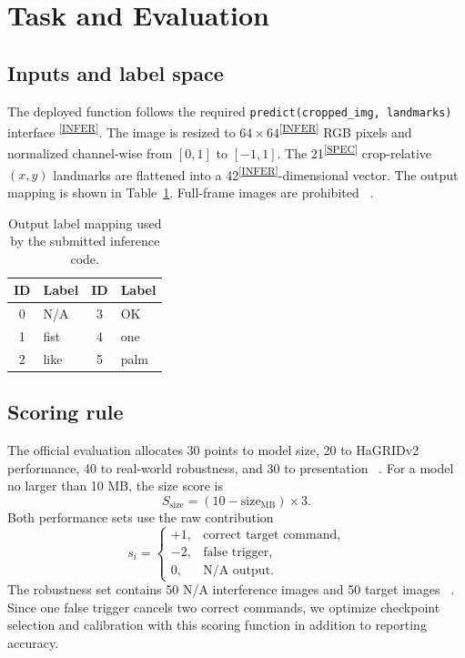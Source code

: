 \documentclass[10pt,twocolumn,a4paper]{article}
\newcommand{\evidence}[1]{\textsuperscript{\scriptsize[\hyperref[ev:#1]{#1}]}}
\newcommand{\result}[2]{#1\evidence{#2}}
\begin{document}
\section{Task and Evaluation}
\label{sec:task}

\subsection{Inputs and label space}

The deployed function follows the required
\texttt{predict(cropped\_img, landmarks)} interface
\evidence{INFER}. The image is resized to
\result{$64\times64$}{INFER} RGB pixels and normalized channel-wise from
$[0,1]$ to $[-1,1]$. The \result{21}{SPEC} crop-relative $(x,y)$ landmarks are
flattened into a \result{42}{INFER}-dimensional vector. The output mapping is
shown in Table~\ref{tab:classes}. Full-frame images are prohibited
~\cite{courseSpec}.

\begin{table}[!b]
  \centering
  \caption{Output label mapping used by the submitted inference code.}
  \label{tab:classes}
  \small
  \begin{tabular}{cl@{\qquad}cl}
    \toprule
    ID & Label & ID & Label \\
    \midrule
    0 & N/A & 3 & OK \\
    1 & fist & 4 & one \\
    2 & like & 5 & palm \\
    \bottomrule
  \end{tabular}
\end{table}

\subsection{Scoring rule}

The official evaluation allocates 30 points to model size, 20 to HaGRIDv2
performance, 40 to real-world robustness, and 30 to presentation
~\cite{courseSpec}. For a model no larger than 10 MB, the size score is
\begin{equation}
S_{\mathrm{size}}=(10-\mathrm{size}_{\mathrm{MB}})\times3.
\end{equation}
Both performance sets use the raw contribution
\begin{equation}
s_i =
\begin{cases}
  +1, & \text{correct target command},\\
  -2, & \text{false trigger},\\
  0,  & \text{N/A output}.
\end{cases}
\end{equation}
The robustness set contains 50 N/A interference images and 50 target images
~\cite{courseSpec}. Since one false trigger cancels two correct commands, we
optimize checkpoint selection and calibration with this scoring function in
addition to reporting accuracy.
\end{document}
